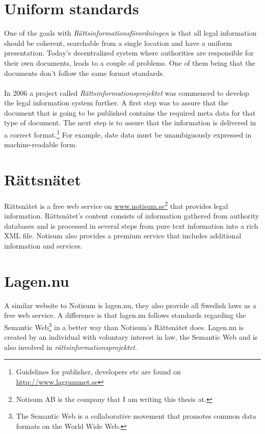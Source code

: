 \documentclass[a4paper,11pt]{kth-mag}
\begin{document}
\section{Uniform standards}
One of the goals with \textit{Rättsinformationsförordningen} is that all legal information should be coherent, 
searchable from a single location and have a uniform presentation. Today’s decentralized system where 
authorities are responsible for their own documents, leads to a couple of problems. One of them being that 
the documents don’t follow the same format standards.\\\\ 
In 2006 a project called \textit{Rättsinformationsprojektet} was commenced to develop the legal information system further. 
A first step was to assure that the document that is going to be published contains the required meta data 
for that type of document. The next step is to assure that the information is delivered in a correct format.\footnote{Guidelines for publisher, developers etc are found on \url{http://www.lagrummet.se}} For example, date data must be unambiguously expressed in machine-readable form. 

\section{Rättsnätet} Rättsnätet is a free web service on
\url{www.notisum.se}\footnote{Notisum AB is the company that I am writing this thesis at.} that provides legal
information. Rättsnätet’s content consists of information gathered from
authority databases and is processed in several steps from pure text information
into a rich XML file. Notisum also provides a premium service that includes
additional information and services.

\section{Lagen.nu}
A similar website to Notisum is lagen.nu, they also provide all Swedish laws as a free web service. A difference is that lagen.nu follows standards regarding the Semantic Web\footnote{The Semantic Web is a collaborative movement that promotes common data formats on the World Wide Web.} in a better way than Notisum's Rättsnätet does. Lagen.nu is created by an individual with voluntary interest in law, the Semantic Web and is also involved in \textit{rättsinformationsprojektet}. 
\end{document}

